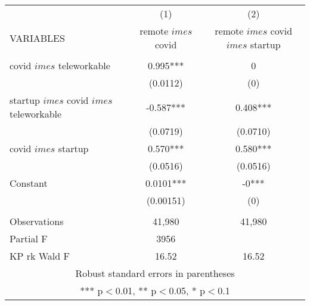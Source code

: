 \begin{tabular}{lcc} \hline
 & (1) & (2) \\
VARIABLES & remote $	imes$ covid & remote $	imes$ covid $	imes$ startup \\ \hline
 &  &  \\
covid $	imes$ teleworkable & 0.995*** & 0 \\
 & (0.0112) & (0) \\
startup $	imes$ covid $	imes$ teleworkable & -0.587*** & 0.408*** \\
 & (0.0719) & (0.0710) \\
covid $	imes$ startup & 0.570*** & 0.580*** \\
 & (0.0516) & (0.0516) \\
Constant & 0.0101*** & -0*** \\
 & (0.00151) & (0) \\
 &  &  \\
Observations & 41,980 & 41,980 \\
Partial F & 3956 &  \\
 KP rk Wald F & 16.52 & 16.52 \\ \hline
\multicolumn{3}{c}{ Robust standard errors in parentheses} \\
\multicolumn{3}{c}{ *** p$<$0.01, ** p$<$0.05, * p$<$0.1} \\
\end{tabular}
